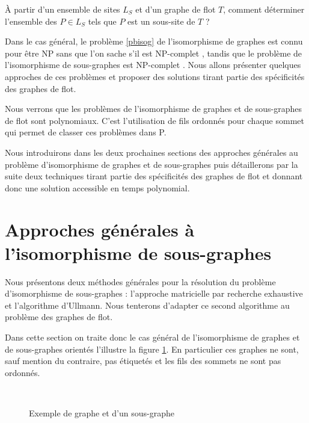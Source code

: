 
\begin{pb}\label{pbisosgbase}
 À partir d'un ensemble de sites $L_S$ et d'un graphe de flot $T$, comment déterminer l'ensemble des $P\in L_S$ tels que $P$ est un sous-site de $T$ ?
\end{pb}

Dans le cas général, le problème \ref{pbisog} de l'isomorphisme de graphes est connu pour être NP sans que l'on sache s'il est NP-complet \cite{Kob94}, tandis que le problème de l'isomorphisme de sous-graphes est NP-complet \cite{W05}.
Nous allons présenter quelques approches de ces problèmes et proposer des solutions tirant partie des spécificités des graphes de flot.

Nous verrons que les problèmes de l'isomorphisme de graphes et de sous-graphes de flot sont polynomiaux.
C'est l'utilisation de fils ordonnés pour chaque sommet qui permet de classer ces problèmes dans P.

Nous introduirons dans les deux prochaines sections des approches générales au problème d'isomorphisme de graphes et de sous-graphes puis détaillerons par la suite deux techniques tirant partie des spécificités des graphes de flot et donnant donc une solution accessible en temps polynomial.

\section{Approches générales à l'isomorphisme de sous-graphes}
Nous présentons deux méthodes générales pour la résolution du problème d'isomorphisme de sous-graphes : l'approche matricielle par recherche exhaustive et l'algorithme d'Ullmann. Nous tenterons d'adapter ce second algorithme au problème des graphes de flot.

Dans cette section on traite donc le cas général de l'isomorphisme de graphes et de sous-graphes orientés l'illustre la figure \ref{fig:ex-graphe-sg}. En particulier ces graphes ne sont, sauf mention du contraire, pas étiquetés et les fils des sommets ne sont pas ordonnés.

\begin{figure}[h]
\begin{center}
  \subfigure[Graphe T]{
\label{fig:ex-graphe}
\texttt{[image: supports/algos/gT\_circo\_cropped0.pdf]}
}\quad
  \subfigure[Graphe P, isomorphe à un sous-graphe de T]{
\label{fig:ex-sg}
\texttt{[image: supports/algos/gP\_circo\_cropped0.pdf]}
}\\
\end{center}
\caption{Exemple de graphe et d'un sous-graphe}
\label{fig:ex-graphe-sg}
\end{figure}

